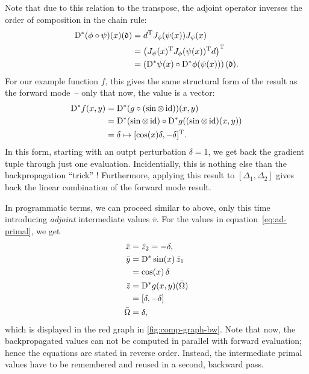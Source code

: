 Note that due to this relation to the transpose, the adjoint operator inverses the order of
composition in the chain rule:
\begin{equation}
  \begin{aligned}
    \mathop{}\!\mathrm{D}^{*} (\phi \circ \psi)(x)(\mathfrak{d}) &= d^{\mathrm{T}} J_{\phi}(\psi(x)) J_{\psi}(x) \\
    &=  \left( J_{\psi}(x)^{\mathrm{T}} J_{\phi}(\psi(x))^{\mathrm{T}} d \right)^{\mathrm{T}} \\
    &= \left( \mathop{}\!\mathrm{D}^{*}\psi(x) \circ \mathop{}\!\mathrm{D}^{*}\phi(\psi(x)) \right)(\mathfrak{d}).
  \end{aligned}
\end{equation}
For our example function \(f\), this gives the same structural form of the result as the forward
mode~-- only that now, the value is a vector:
\begin{equation}
  \begin{aligned}
    \mathop{}\!\mathrm{D}^{*} f(x, y) &= \mathop{}\!\mathrm{D}^{*} (g \circ (\sin \otimes \operatorname{id}))(x, y) \\
    &= \mathop{}\!\mathrm{D}^{*}(\sin \otimes \operatorname{id}) \circ \mathop{}\!\mathrm{D}^{*} g((\sin \otimes \operatorname{id})(x, y)) \\
    &= \delta \mapsto [\cos(x)\delta, -\delta]^{\mathrm{T}}.
  \end{aligned}
\end{equation}
In this form, starting with an outpt perturbation \(\delta = 1\), we get back the gradient tuple
through just one evaluation.  Incidentially, this is nothing else than the backpropagation
\enquote{trick} \parencite{bishop2006pattern}!  Furthermore, applying this result to
\([\Delta_1, \Delta_2]\) gives back the linear combination of the forward mode result.

In programmatic terms, we can proceed similar to above, only this time introducing \emph{adjoint}
intermediate values \(\bar{v}\).  For the values in equation~\eqref{eq:ad-primal}, we get
\begin{equation}
  \label{eq:ad-backward}
  \begin{aligned}
    \bar{x} &= \bar{z}_2 = -\delta, \\
    \bar{y} &= \mathop{}\!\mathrm{D}^{*}\sin(x) \, \bar{z}_1 \\
    &= \cos(x) \, \delta\\
    \bar{z} &= \mathop{}\!\mathrm{D}^{*} g(x, y)(\bar{\Omega}) \\
    &= [\delta, -\delta] \\
    \bar{\Omega} &= \delta,
  \end{aligned}
\end{equation}
which is displayed in the red graph in \ref{fig:comp-graph-bw}.  Note that now, the backpropagated
values can not be computed in parallel with forward evaluation; hence the equations are stated in
reverse order.  Instead, the intermediate primal values have to be remembered and reused in a
second, backward pass.

